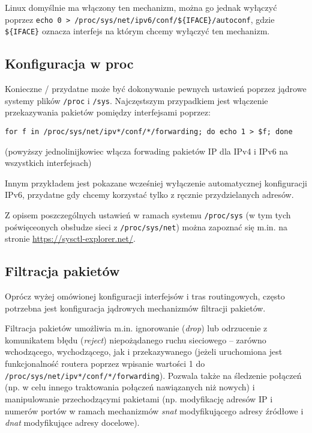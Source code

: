 Linux domyślnie ma włączony ten mechanizm, można go jednak wyłączyć poprzez \Verb#echo 0 > /proc/sys/net/ipv6/conf/${IFACE}/autoconf#, gdzie \Verb#${IFACE}# oznacza interfejs na którym chcemy wyłączyć ten mechanizm.


\subsection{Konfiguracja w proc}

Konieczne / przydatne może być dokonywanie pewnych ustawień poprzez jądrowe systemy plików \Verb$/proc$ i \Verb$/sys$.
Najczęstszym przypadkiem jest włączenie przekazywania pakietów pomiędzy interfejsami poprzez:

\begin{verbatim}
for f in /proc/sys/net/ipv*/conf/*/forwarding; do echo 1 > $f; done
\end{verbatim}
(powyższy jednolinijkowiec włącza forwading pakietów IP dla IPv4 i IPv6 na wszystkich interfejsach)

Innym przykładem jest pokazane wcześniej wyłączenie automatycznej konfiguracji IPv6, przydatne gdy chcemy korzystać tylko z ręcznie przydzielanych adresów.

Z opisem poszczególnych ustawień w ramach systemu \Verb$/proc/sys$ (w tym tych poświęceonych obsłudze sieci z \Verb$/proc/sys/net$) można zapoznać się m.in. na stronie \url{https://sysctl-explorer.net/}.


\subsection{Filtracja pakietów}

Oprócz wyżej omówionej konfiguracji interfejsów i tras routingowych, często potrzebna jest konfiguracja jądrowych mechanizmów filtracji pakietów.

Filtracja pakietów umożliwia m.in. ignorowanie (\textit{drop}) lub odrzucenie z komunikatem błędu (\textit{reject}) niepożądanego ruchu sieciowego
	– zarówno wchodzącego, wychodzącego, jak i przekazywanego (jeżeli uruchomiona jest funkcjonalność routera poprzez wpisanie wartości 1 do \Verb$/proc/sys/net/ipv*/conf/*/forwarding$).
Pozwala także na śledzenie połączeń (np. w celu innego traktowania połączeń nawiązanych niż nowych)
	i manipulowanie przechodzącymi pakietami (np. modyfikację adresów IP i numerów portów w ramach mechanizmów \textit{snat} modyfikującego adresy źródłowe i \textit{dnat} modyfikujące adresy docelowe).

